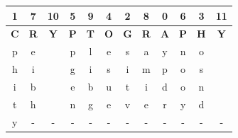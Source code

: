 \documentclass{ashoka-crypto}
\begin{document}
\begin{center}
\begin{tabular}{|c|c|c|c|c|c|c|c|c|c|c|c|}
\hline
1          & 7          & 10         & 5          & 9          & 4          & 2          & 8          & 0          & 6          & 3          & 11         \\ \hline
\textbf{C} & \textbf{R} & \textbf{Y} & \textbf{P} & \textbf{T} & \textbf{O} & \textbf{G} & \textbf{R} & \textbf{A} & \textbf{P} & \textbf{H} & \textbf{Y} \\ \hline
p          & e          &            & p          & l          & e          & s          & a          & y          & n          & o          &            \\ \hline
h          & i          &            & g          & i          & s          & i          & m          & p          & o          & s          &            \\ \hline
i          & b          &            & e          & b          & u          & t          & i          & d          & o          & n          &            \\ \hline
t          & h          &            & n          & g          & e          & v          & e          & r          & y          & d          &            \\ \hline
y          &     -       &    -        &      -     &     -       &      -      &     -       &     -       &      -      &     -       &       -     &  -            \\ \hline
\end{tabular}
\end{center}
\end{document}
